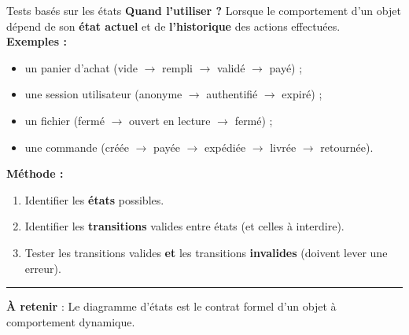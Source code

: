 \documentclass[aspectratio=169,11pt]{beamer}
\newcommand{\takeaway}[1]{%
\vfill\begin{beamercolorbox}[wd=\linewidth,sep=0.4em]{}
\color{accent2}\rule[0.6ex]{1.2em}{1.2pt}\hspace{0.4em}%
\textbf{\color{accent2}\small À retenir} \textcolor{textsoft}{:} %
{\small\color{textmain}#1}
\end{beamercolorbox}}
\begin{document}
\begin{frame}[t]{Tests basés sur les états}
\footnotesize
\textbf{Quand l'utiliser ?} Lorsque le comportement d'un objet dépend de son \textbf{état actuel} et de \textbf{l'historique} des actions effectuées.\\[0.4em]
\textbf{Exemples :}
\begin{itemize}\itemsep0.05em
\item un panier d'achat (vide $\to$ rempli $\to$ validé $\to$ payé) ;
\item une session utilisateur (anonyme $\to$ authentifié $\to$ expiré) ;
\item un fichier (fermé $\to$ ouvert en lecture $\to$ fermé) ;
\item une commande (créée $\to$ payée $\to$ expédiée $\to$ livrée $\to$ retournée).
\end{itemize}
\vspace{0.3cm}
\textbf{Méthode :}\\[0.2em]
\begin{enumerate}\itemsep0.1em
\item Identifier les \textbf{états} possibles.
\item Identifier les \textbf{transitions} valides entre états (et celles à interdire).
\item Tester les transitions valides \textbf{et} les transitions \textbf{invalides} (doivent lever une erreur).
\end{enumerate}
\takeaway{Le diagramme d'états est le contrat formel d'un objet à comportement dynamique.}
\end{frame}
\end{document}
